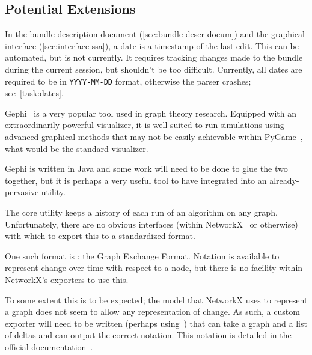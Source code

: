 \subsection{Potential Extensions}
\label{sec:tasks:ext}

\begin{task}
  \label{tast:autodate}
  In the bundle description document (\autoref{sec:bundle-descr-docum})
    and the graphical interface (\autoref{sec:interface-ssa}),
    a date is a timestamp of the last edit.
  This can be automated, but is not currently.
  It requires tracking changes made to the bundle during the current session,
    but shouldn't be too difficult.
  Currently, all dates are required to be in \texttt{YYYY-MM-DD} format,
    otherwise the parser crashes; see~\autoref{task:dates}.
\end{task}

\begin{task}
  \label{task:gephi-glue}
  Gephi~\autocite{gephi} is a very popular tool used in graph theory research.
  Equipped with an extraordinarily powerful visualizer,
    it is well-suited to run simulations using advanced graphical methods
    that may not be easily achievable within PyGame~\autocite{pygame},
    what would be the standard visualizer.
  
  Gephi is written in Java and some work will need to be done
    to glue the two together, but it is perhaps a very useful tool to have
    integrated into an already-pervasive utility.
\end{task}

\begin{task}
  \label{task:anigexf}
  The core utility keeps a history of each run of an algorithm on any graph.
  Unfortunately, there are no obvious interfaces
    (within NetworkX~\autocite{hagberg:networkx} or otherwise)
    with which to export this to a standardized format.

  One such format is : the Graph Exchange Format.
  Notation is available to represent change over time with respect to a node,
    but there is no facility within NetworkX's exporters to use this.

  To some extent this is to be expected; the model that NetworkX uses to represent a graph
    does not seem to allow any representation of change.
  As such, a custom exporter will need to be written (perhaps using~\autocite{pygexf}) that
    can take a graph and a list of deltas and can output the correct notation.
  This notation is detailed in the official documentation~\autocite{gexf}.
\end{task}


